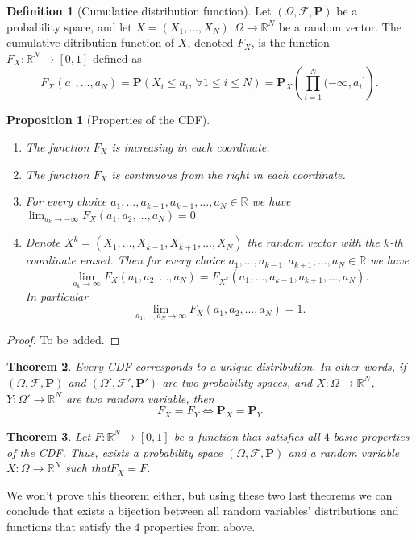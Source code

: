 \documentclass[11pt,a4paper]{article}
\theoremstyle{definition}
\newtheorem{definition}{Definition}[section]
\theoremstyle{plain}
\newtheorem{theorem}{Theorem}[section]
\newtheorem{proposition}[theorem]{Proposition}
\newcommand{\R}{\mathbb{R}}
\begin{document}
  \begin{definition}[Cumulatice distribution function]
    Let $(\Omega, \mathcal F, \mathbf P)$ be a probability space, 
    and let $X = (X_1,\dots,X_N) \colon \Omega \to \R^N$ be a random vector.
    The cumulative ditribution function of $X$, denoted $F_X$, is the function
    $F_X \colon \R^N \to [0,1]$ defined as
    \[
      F_X(a_1,\dots,a_N) =
      \mathbf P(X_i \le a_i,\, \forall 1 \le i \le N) =
      \mathbf P_X\left(\prod_{i=1}^{N}(-\infty,a_i]\right).
    \]
  \end{definition}

  \begin{proposition}[Properties of the CDF]
    \begin{enumerate}
      \item The function $F_X$ is increasing in each coordinate.
      \item The function $F_X$ is continuous from the right in each 
        coordinate.
      \item For every choice $a_1,\dots,a_{k-1},a_{k+1},\dots,a_N \in \R$
        we have $\lim_{a_k \to -\infty}{F_X(a_1,a_2,\dots,a_N)} = 0$
      \item Denote $X^k = (X_1,\dots,X_{k-1},X_{k+1},\dots,X_N)$ the random 
      vector with the $k$-th coordinate erased. 
      Then for every choice $a_1,\dots,a_{k-1},a_{k+1},\dots,a_N \in \R$
      we have
      \[
        \lim_{a_k \to \infty} F_X(a_1,a_2,\dots,a_N) =
        F_{X^k}(a_1,\dots,a_{k-1},a_{k+1},\dots,a_N).
      \]
      In particular
      \[
        \lim_{a_1,\dots,a_N \to \infty} F_X(a_1,a_2,\dots,a_N) = 1.
      \]
    \end{enumerate}
  \end{proposition}
  \begin{proof}
    To be added.
  \end{proof}

  \begin{theorem}
    Every CDF corresponds to a unique distribution. In other words, if
    $(\Omega, \mathcal F, \mathbf P)$ and $(\Omega', \mathcal F', \mathbf P')$
    are two probability spaces, and $X \colon \Omega \to \R^N$,
    $Y \colon \Omega' \to \R^N$ are two random variable, then
    \[
      F_X = F_Y \iff \mathbf P_X = \mathbf P_Y
    \]
  \end{theorem}
  \begin{theorem}
    Let $F \colon \R^N \to [0,1]$ be a function that satisfies all $4$ basic
    properties of the CDF. Thus, exists a probability space 
    $(\Omega, \mathcal F, \mathbf P)$ and a random variable 
    $X \colon \Omega \to \R^N$ such that$F_X = F$.
  \end{theorem}
  We won't prove this theorem either, but using these two last theorems
  we can conclude that exists a bijection between all random variables'
  distributions and functions that satisfy the $4$ properties from above.
\end{document}
